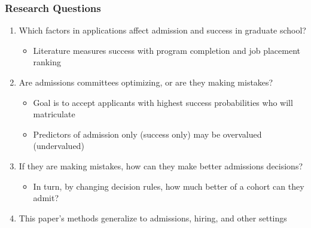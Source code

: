 \documentclass[12pt, aspectratio=169]{beamer}
\begin{document}
\begin{frame}[label=rq]
\frametitle{Research Questions}
\begin{enumerate}
\item Which factors in applications affect admission and success in graduate school?
\vspace{5pt}
\begin{itemize}
\item Literature measures success with program completion and job placement ranking
\vspace{10pt}
\end{itemize}
\item Are admissions committees optimizing, or are they making mistakes?
\vspace{5pt}
\begin{itemize}
\item Goal is to accept applicants with highest success probabilities who will matriculate
\vspace{5pt}
\item Predictors of admission only (success only) may be overvalued (undervalued)
\vspace{10pt}
\end{itemize}
\item If they are making mistakes, how can they make better admissions decisions?
\vspace{5pt}
\begin{itemize}
\item In turn, by changing decision rules, how much better of a cohort can they admit?
\vspace{10pt}
\end{itemize}
\item[$\bigstar$] This paper's methods generalize to admissions, hiring, and other settings
\end{enumerate}
\end{frame}
\end{document}
